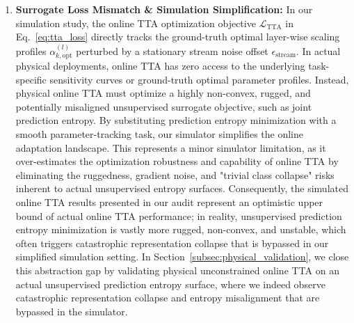 \begin{enumerate}
To resolve this trade-off, future work should explore alternative, flexible trajectory regularizations.
For example, piecewise linear splines with knots placed at attention-MLP boundaries, or block-wise parameter-sharing schemes that group and optimize attention and MLP layers separately, can maintain a low-dimensional search space (filtering noise) while providing the structural flexibility required to capture localized sensitivity spikes in actual transformer backbones.
    \item \textbf{Surrogate Loss Mismatch \& Simulation Simplification:} In our simulation study, the online TTA optimization objective $\mathcal{L}_{\text{TTA}}$ in Eq.~\eqref{eq:tta_loss} directly tracks the ground-truth optimal layer-wise scaling profiles $\alpha_{k, \text{opt}}^{(l)}$ perturbed by a stationary stream noise offset $\epsilon_{\text{stream}}$.
In actual physical deployments, online TTA has zero access to the underlying task-specific sensitivity curves or ground-truth optimal parameter profiles.
Instead, physical online TTA must optimize a highly non-convex, rugged, and potentially misaligned unsupervised surrogate objective, such as joint prediction entropy.
By substituting prediction entropy minimization with a smooth parameter-tracking task, our simulator simplifies the online adaptation landscape.
This represents a minor simulator limitation, as it over-estimates the optimization robustness and capability of online TTA by eliminating the ruggedness, gradient noise, and "trivial class collapse" risks inherent to actual unsupervised entropy surfaces.
Consequently, the simulated online TTA results presented in our audit represent an optimistic upper bound of actual online TTA performance; in reality, unsupervised prediction entropy minimization is vastly more rugged, non-convex, and unstable, which often triggers catastrophic representation collapse that is bypassed in our simplified simulation setting.
In Section~\ref{subsec:physical_validation}, we close this abstraction gap by validating physical unconstrained online TTA on an actual unsupervised prediction entropy surface, where we indeed observe catastrophic representation collapse and entropy misalignment that are bypassed in the simulator.
\end{enumerate}

